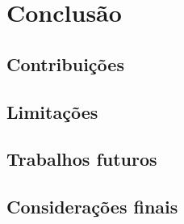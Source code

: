   \chapter{Conclusão}
  
  \section{Contribuições}
  
  \section{Limitações}

  \section{Trabalhos futuros}
  
  \section{Considerações finais}